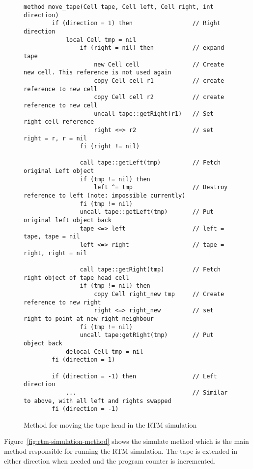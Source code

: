 \begin{figure}[ht]
    \centering
    \begin{lstlisting}[style = basic, language = roopl]
    method move_tape(Cell tape, Cell left, Cell right, int direction)
        if (direction = 1) then                 // Right direction
            local Cell tmp = nil
                if (right = nil) then           // expand tape
                    new Cell cell               // Create new cell. This reference is not used again
                    copy Cell cell r1           // create reference to new cell
                    copy Cell cell r2           // create reference to new cell
                    uncall tape::getRight(r1)   // Set right cell reference
                    right <=> r2                // set right = r, r = nil
                fi (right != nil)         

                call tape::getLeft(tmp)         // Fetch original Left object
                if (tmp != nil) then  
                    left ^= tmp                 // Destroy reference to left (note: impossible currently)
                fi (tmp != nil)   
                uncall tape::getLeft(tmp)       // Put original left object back
                tape <=> left                   // left = tape, tape = nil 
                left <=> right                  // tape = right, right = nil

                call tape::getRight(tmp)        // Fetch right object of tape head cell
                if (tmp != nil) then  
                    copy Cell right_new tmp     // Create reference to new right
                    right <=> right_new         // set right to point at new right neighbour
                fi (tmp != nil)   
                uncall tape:getRight(tmp)       // Put object back
            delocal Cell tmp = nil
        fi (direction = 1)

        if (direction = -1) then                // Left direction
            ...                                 // Similar to above, with all left and rights swapped
        fi (direction = -1)
    \end{lstlisting}
    \caption{Method for moving the tape head in the RTM simulation}
    \label{fig:rtm-move-tape-head-method}
\end{figure} 

Figure~\ref{fig:rtm-simulation-method} shows the simulate method which is the main method responsible for running the RTM simulation. The tape is extended in either direction when needed and the program counter is incremented.

